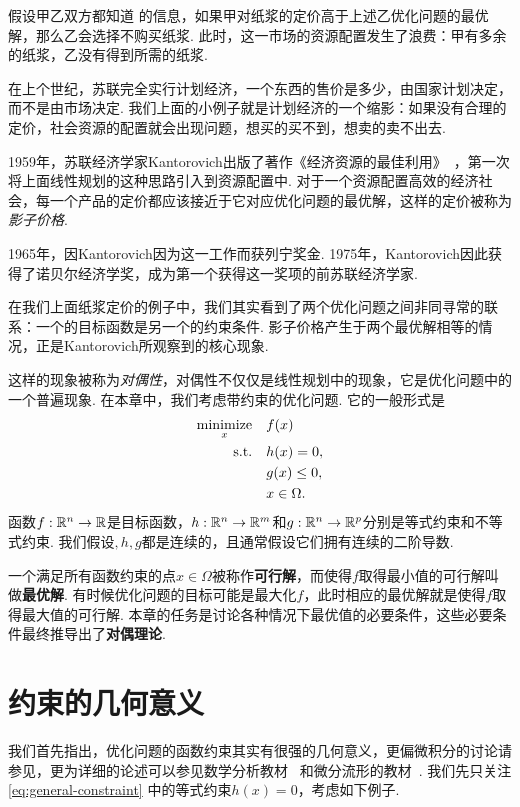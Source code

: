 假设甲乙双方都知道 的信息，如果甲对纸浆的定价高于上述乙优化问题的最优解，那么乙会选择不购买纸浆. 此时，这一市场的资源配置发生了浪费：甲有多余的纸浆，乙没有得到所需的纸浆.

在上个世纪，苏联完全实行计划经济，一个东西的售价是多少，由国家计划决定，而不是由市场决定. 我们上面的小例子就是计划经济的一个缩影：如果没有合理的定价，社会资源的配置就会出现问题，想买的买不到，想卖的卖不出去.

1959年，苏联经济学家Kantorovich出版了著作《经济资源的最佳利用》~\cite{kantorovichBestUseEconomic1965}，第一次将上面线性规划的这种思路引入到资源配置中. 对于一个资源配置高效的经济社会，每一个产品的定价都应该接近于它对应优化问题的最优解，这样的定价被称为\textit{影子价格}. 

1965年，因Kantorovich因为这一工作而获列宁奖金. 1975年，Kantorovich因此获得了诺贝尔经济学奖，成为第一个获得这一奖项的前苏联经济学家. 

在我们上面纸浆定价的例子中，我们其实看到了两个优化问题之间非同寻常的联系：一个的目标函数是另一个的约束条件. 影子价格产生于两个最优解相等的情况，正是Kantorovich所观察到的核心现象. 

这样的现象被称为\textit{对偶性}，对偶性不仅仅是线性规划中的现象，它是优化问题中的一个普遍现象. 在本章中，我们考虑带约束的优化问题. 它的一般形式是
\begin{equation}
\begin{aligned}
    \operatorname*{minimize}_x\quad& f(x) \\
    \text{s.t.}\quad& h(x)=0,\\
    & g(x)\leq 0, \\
    & x \in \Omega.
\end{aligned}\label{eq:general-constraint}    
\end{equation}
函数$f:\mathbb{R}^n\to \mathbb{R}$是目标函数，$h:\mathbb{R}^n\to \mathbb{R}^m$和$g:\mathbb{R}^n\to \mathbb{R}^p$分别是等式约束和不等式约束. 我们假设$
,h,g$都是连续的，且通常假设它们拥有连续的二阶导数.

一个满足所有函数约束的点$x\in\Omega$被称作\textbf{可行解}，而使得$f$取得最小值的可行解叫做\textbf{最优解}. 有时候优化问题的目标可能是最大化$f$，此时相应的最优解就是使得$f$取得最大值的可行解. 本章的任务是讨论各种情况下最优值的必要条件，这些必要条件最终推导出了\textbf{对偶理论}. 

\section{约束的几何意义}\label{sec:constraint-geometry}

我们首先指出，优化问题的函数约束其实有很强的几何意义，更偏微积分的讨论请参见，更为详细的论述可以参见数学分析教材~\cite{zorichMathematicalAnalysis2015} 和微分流形的教材~\cite{leeIntroductionSmoothManifolds2012}. 我们先只关注 \eqref{eq:general-constraint} 中的等式约束$h(x)=0$，考虑如下例子. 

